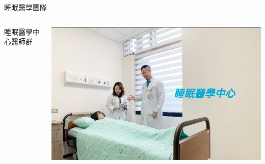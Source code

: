 \documentclass[aspectratio=169]{beamer}
\begin{document}
\begin{frame}{睡眠醫學團隊}
\begin{columns}[onlytextwidth]
\begin{block}{睡眠醫學中心醫師群}
\end{block}
\vskip1cm
\begin{block}{}
\includegraphics[height=0.3\textheight]{CostUnitImage1202104151044255.jpg}%
\end{block}
\end{columns}


\end{frame}

\begin{frame}[label={lastframe}]
\end{frame}

\end{document}
